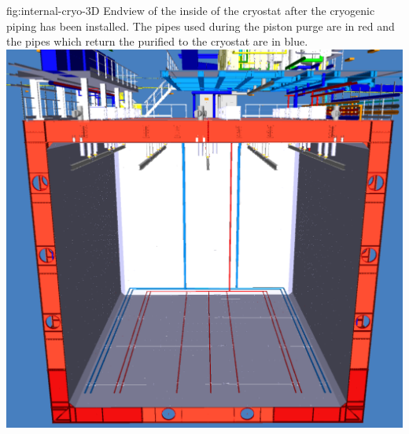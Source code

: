 \begin{dunefigure}{fig:internal-cryo-3D}
  {Endview of the inside of the cryostat after the cryogenic piping has been installed. The  pipes used during the piston purge are in red and the pipes which return the purified  to the cryostat are in blue.}
\includegraphics[width=.98\textwidth]{graphics/Internal-Piping-3D.pdf}
\end{dunefigure}

